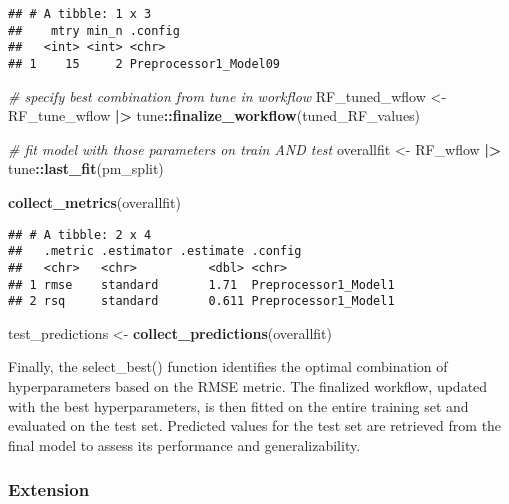 \documentclass[
]{article}
\newenvironment{Shaded}{\begin{snugshade}}{\end{snugshade}}
\newcommand{\CommentTok}[1]{\textcolor[rgb]{0.56,0.35,0.01}{\textit{#1}}}
\newcommand{\FunctionTok}[1]{\textcolor[rgb]{0.13,0.29,0.53}{\textbf{#1}}}
\newcommand{\NormalTok}[1]{#1}
\newcommand{\OtherTok}[1]{\textcolor[rgb]{0.56,0.35,0.01}{#1}}
\newcommand{\SpecialCharTok}[1]{\textcolor[rgb]{0.81,0.36,0.00}{\textbf{#1}}}
\begin{document}
\begin{verbatim}
## # A tibble: 1 x 3
##    mtry min_n .config              
##   <int> <int> <chr>                
## 1    15     2 Preprocessor1_Model09
\end{verbatim}

\begin{Shaded}
\begin{Highlighting}[]
\CommentTok{\# specify best combination from tune in workflow}
\NormalTok{RF\_tuned\_wflow }\OtherTok{\textless{}{-}}\NormalTok{RF\_tune\_wflow }\SpecialCharTok{|\textgreater{}}
\NormalTok{  tune}\SpecialCharTok{::}\FunctionTok{finalize\_workflow}\NormalTok{(tuned\_RF\_values)}

\CommentTok{\# fit model with those parameters on train AND test}
\NormalTok{overallfit }\OtherTok{\textless{}{-}}\NormalTok{ RF\_wflow }\SpecialCharTok{|\textgreater{}}
\NormalTok{  tune}\SpecialCharTok{::}\FunctionTok{last\_fit}\NormalTok{(pm\_split)}

\FunctionTok{collect\_metrics}\NormalTok{(overallfit)}
\end{Highlighting}
\end{Shaded}

\begin{verbatim}
## # A tibble: 2 x 4
##   .metric .estimator .estimate .config             
##   <chr>   <chr>          <dbl> <chr>               
## 1 rmse    standard       1.71  Preprocessor1_Model1
## 2 rsq     standard       0.611 Preprocessor1_Model1
\end{verbatim}

\begin{Shaded}
\begin{Highlighting}[]
\NormalTok{test\_predictions }\OtherTok{\textless{}{-}} \FunctionTok{collect\_predictions}\NormalTok{(overallfit)}
\end{Highlighting}
\end{Shaded}

Finally, the select\_best() function identifies the optimal combination
of hyperparameters based on the RMSE metric. The finalized workflow,
updated with the best hyperparameters, is then fitted on the entire
training set and evaluated on the test set. Predicted values for the
test set are retrieved from the final model to assess its performance
and generalizability.

\subsubsection{Extension}\label{extension}
\end{document}
